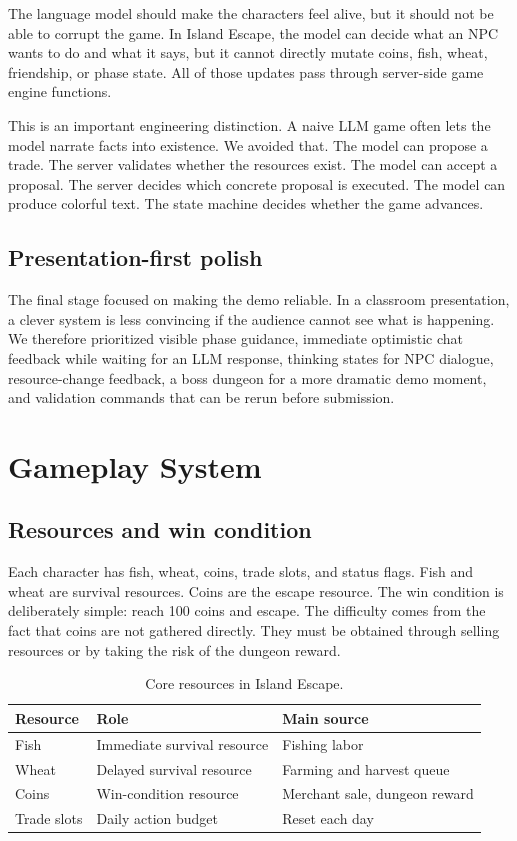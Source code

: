 \documentclass[11pt]{article}
\begin{document}
The language model should make the characters feel alive, but it should not be
able to corrupt the game. In Island Escape, the model can decide what an NPC
wants to do and what it says, but it cannot directly mutate coins, fish, wheat,
friendship, or phase state. All of those updates pass through server-side game
engine functions.

This is an important engineering distinction. A naive LLM game often lets the
model narrate facts into existence. We avoided that. The model can propose a
trade. The server validates whether the resources exist. The model can accept a
proposal. The server decides which concrete proposal is executed. The model can
produce colorful text. The state machine decides whether the game advances.

\subsection{Presentation-first polish}

The final stage focused on making the demo reliable. In a classroom
presentation, a clever system is less convincing if the audience cannot see what
is happening. We therefore prioritized visible phase guidance, immediate
optimistic chat feedback while waiting for an LLM response, thinking states for
NPC dialogue, resource-change feedback, a boss dungeon for a more dramatic demo
moment, and validation commands that can be rerun before submission.

\section{Gameplay System}

\subsection{Resources and win condition}

Each character has fish, wheat, coins, trade slots, and status flags. Fish and
wheat are survival resources. Coins are the escape resource. The win condition
is deliberately simple: reach 100 coins and escape. The difficulty comes from
the fact that coins are not gathered directly. They must be obtained through
selling resources or by taking the risk of the dungeon reward.

\begin{table}[h]
\centering
\begin{tabular}{lll}
\toprule
Resource & Role & Main source \\
\midrule
Fish & Immediate survival resource & Fishing labor \\
Wheat & Delayed survival resource & Farming and harvest queue \\
Coins & Win-condition resource & Merchant sale, dungeon reward \\
Trade slots & Daily action budget & Reset each day \\
\bottomrule
\end{tabular}
\caption{Core resources in Island Escape.}
\end{table}
\end{document}
